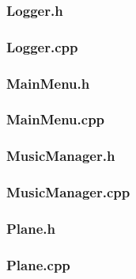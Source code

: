\documentclass{article}
\begin{document}
\subsubsection{Logger.h}
	 
	 				
\subsubsection{Logger.cpp}
	
	 				
\subsubsection{MainMenu.h}
	

\subsubsection{MainMenu.cpp}
		 
 				
\subsubsection{MusicManager.h}
	
	 				
\subsubsection{MusicManager.cpp}
	
	 				
\subsubsection{Plane.h}
	
	 				
\subsubsection{Plane.cpp}
	
	 			
\end{document}
